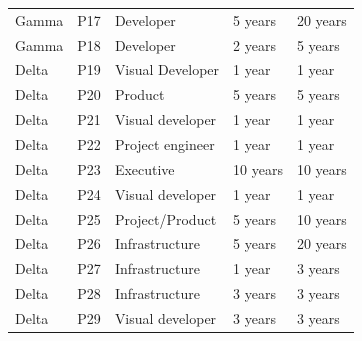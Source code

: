 \documentclass[smallextended]{svjour3}       %
\begin{document}
\begin{table}[!h]
\begin{tabular}{p{1.5cm}p{0.6cm}p{2.5cm}p{3.5cm}p{2cm}}
Gamma & P17 & Developer & 5 years & 20 years\\
Gamma & P18 & Developer & 2 years & 5 years\\
Delta & P19 & Visual Developer & 1 year & 1 year\\
Delta & P20 & Product  & 5 years & 5 years\\
Delta & P21 & Visual developer & 1 year & 1 year\\
Delta & P22 & Project engineer & 1 year & 1 year\\
Delta & P23 & Executive & 10 years & 10 years\\
Delta & P24 & Visual developer & 1 year & 1 year\\
Delta & P25 & Project/Product & 5 years & 10 years\\
Delta & P26 & Infrastructure & 5 years & 20 years\\
Delta & P27 & Infrastructure & 1 year & 3 years\\
Delta & P28 & Infrastructure & 3 years & 3 years\\
Delta & P29 & Visual developer & 3 years & 3 years\\


\bottomrule
\end{tabular}
    
\end{table}




\end{document}

